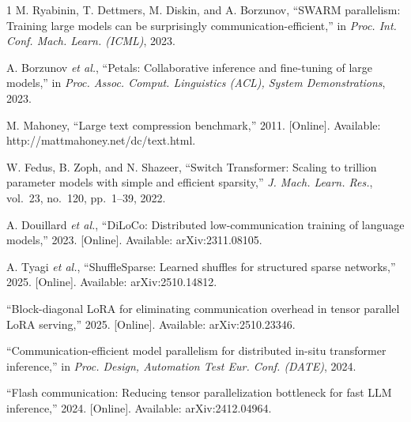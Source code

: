 \documentclass[10pt,journal]{IEEEtran}
\begin{document}
\begin{thebibliography}{1}
M. Ryabinin, T. Dettmers, M. Diskin, and A. Borzunov, ``SWARM parallelism: Training large
models can be surprisingly communication-efficient,'' in \emph{Proc. Int. Conf. Mach. Learn.
(ICML)}, 2023.

A. Borzunov \emph{et al.}, ``Petals: Collaborative inference and fine-tuning of large models,''
in \emph{Proc. Assoc. Comput. Linguistics (ACL), System Demonstrations}, 2023.

M. Mahoney, ``Large text compression benchmark,'' 2011. [Online]. Available:
http://mattmahoney.net/dc/text.html.

W. Fedus, B. Zoph, and N. Shazeer, ``Switch Transformer: Scaling to trillion parameter models
with simple and efficient sparsity,'' \emph{J. Mach. Learn. Res.}, vol.~23, no.~120,
pp.~1--39, 2022.

A. Douillard \emph{et al.}, ``DiLoCo: Distributed low-communication training of language
models,'' 2023. [Online]. Available: arXiv:2311.08105.

A. Tyagi \emph{et al.}, ``ShuffleSparse: Learned shuffles for structured sparse networks,'' 2025.
[Online]. Available: arXiv:2510.14812.

``Block-diagonal LoRA for eliminating communication overhead in tensor parallel LoRA serving,''
2025. [Online]. Available: arXiv:2510.23346.

``Communication-efficient model parallelism for distributed in-situ transformer inference,'' in
\emph{Proc. Design, Automation Test Eur. Conf. (DATE)}, 2024.

``Flash communication: Reducing tensor parallelization bottleneck for fast LLM inference,'' 2024.
[Online]. Available: arXiv:2412.04964.
\end{thebibliography}
\end{document}
